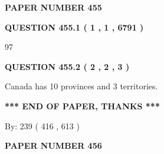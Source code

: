 \documentclass[12pt]{article}
\begin{document}
   
   
   
 {\textbf{ \Large{ PAPER NUMBER  455  }}}
   
   
\vspace{0.2in}
   
   
   
   
   
   
 \vspace{0.2in}
 
 
 
 
   
   
  
\vspace{0.2in}
  
{\textbf{\Large{QUESTION
455.1 
 ( 1 , 1 , 6791 )
}}}
  
  
 
 
\noindent{}

97
 
 
  
\vspace{0.2in}
  
{\textbf{\Large{QUESTION
455.2 
 ( 2 , 2 , 3 )
}}}
  
  
 
 
\noindent{}
 
 
Canada has 10  provinces and 3 territories.
 
 
 
 
   
   
 \vspace{0.2in}
 
   
   
   
   
\vspace{1.0in} 
{\textbf{\large{ *** END OF PAPER, THANKS *** }}} 
   
   
\hspace{1.0in} By: 
 239 ( 416 ,  613 )
   
   
   
   
\newpage 
\setcounter{page}{ 
   456001 } 
   
   
   
   
 {\textbf{ \Large{ PAPER NUMBER  456  }}}
   
   
\vspace{0.2in}
   
\end{document}
